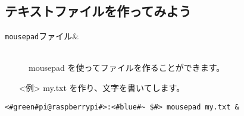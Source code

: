 \subsection{テキストファイルを作ってみよう}
\begin{description}
\item[\texttt{mousepad}\textvisiblespace ファイル\textvisiblespace \&]\mbox{}\\
mousepad を使ってファイルを作ることができます。
\end{description}
\begin{itemize}
\item[<例>]my.txt を作り、文字を書いてします。
\end{itemize}
\begin{lstlisting}[caption=mousepadの例, label=mousepad]
<#green#pi@raspberrypi#>:<#blue#~ $#> mousepad my.txt &
\end{lstlisting}
\begin{tcolorbox}[title=\useOmetoi]
\begin{enumerate}
\end{enumerate}
\end{tcolorbox}
